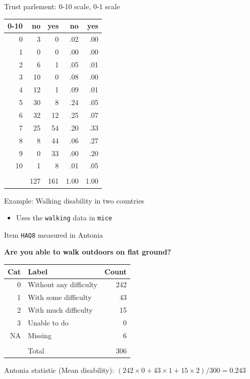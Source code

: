 \documentclass[ignorenonframetext,aspectratio=43]{beamer}
\providecommand{\tightlist}{%
  \setlength{\itemsep}{0pt}\setlength{\parskip}{0pt}}
\begin{document}
\begin{frame}{Trust parlement: 0-10 scale, 0-1 scale}
\protect\hypertarget{trust-parlement-0-10-scale-0-1-scale}{}

\begin{longtable}[]{@{}rrrrr@{}}
\toprule
0-10 & no & yes & no & yes\tabularnewline
\midrule
\endhead
0 & 3 & 0 & .02 & .00\tabularnewline
1 & 0 & 0 & .00 & .00\tabularnewline
2 & 6 & 1 & .05 & .01\tabularnewline
3 & 10 & 0 & .08 & .00\tabularnewline
4 & 12 & 1 & .09 & .01\tabularnewline
5 & 30 & 8 & .24 & .05\tabularnewline
6 & 32 & 12 & .25 & .07\tabularnewline
7 & 25 & 54 & .20 & .33\tabularnewline
8 & 8 & 44 & .06 & .27\tabularnewline
9 & 0 & 33 & .00 & .20\tabularnewline
10 & 1 & 8 & .01 & .05\tabularnewline
& & & &\tabularnewline
& 127 & 161 & 1.00 & 1.00\tabularnewline
\bottomrule
\end{longtable}

\end{frame}

\begin{frame}[fragile]{Example: Walking disability in two countries}
\protect\hypertarget{example-walking-disability-in-two-countries}{}

\begin{itemize}
\tightlist
\item
  Uses the \texttt{walking} data in \texttt{mice}
\end{itemize}

\end{frame}

\begin{frame}{Item \texttt{HAQ8} measured in Antonia}
\protect\hypertarget{item-haq8-measured-in-antonia}{}

\textbf{Are you able to walk outdoors on flat ground?}

\begin{longtable}[]{@{}rlr@{}}
\toprule
Cat & Label & Count\tabularnewline
\midrule
\endhead
0 & Without any difficulty & 242\tabularnewline
1 & With some difficulty & 43\tabularnewline
2 & With much difficulty & 15\tabularnewline
3 & Unable to do & 0\tabularnewline
NA & Missing & 6\tabularnewline
& &\tabularnewline
& Total & 306\tabularnewline
\bottomrule
\end{longtable}

Antonia statistic (Mean disability):
\((242 \times 0+43 \times 1+15 \times 2)/ 300 = 0.243\)

\end{frame}
\end{document}
